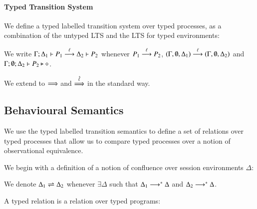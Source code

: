 \paragraph{Typed Transition System}

We define a typed labelled transition system over typed processes,
as a combination of the untyped LTS and the LTS for typed environments:

\begin{definition}\label{d:tlts}\rm
	We write
%
	$\Gamma; \Delta_1 \vdash P_1 \stackrel{\ell}{\longrightarrow} \Delta_2 \vdash P_2$
	whenever
	$P_1 \stackrel{\ell}{\longrightarrow} P_2$,
	$(\Gamma, \emptyset, \Delta_1) \stackrel{\ell}{\longrightarrow} (\Gamma, \emptyset, \Delta_2)$
	and $\Gamma; \emptyset; \Delta_2 \vdash P_2 \triangleright \diamond$.

%
\end{definition}

We extend to $\stackrel{}{\Longrightarrow}$ and $\stackrel{\hat{\ell}}{\Longrightarrow}$ in the standard way.



\subsection{Behavioural Semantics}

We use the typed labelled transition semantics to define
a set of relations over typed processes that allow us to compare
typed processes over a notion of observational equivalence.

We begin with a definition of a notion of confluence
over session environments $\Delta$:
%
\begin{definition}\rm
	We denote $\Delta_1 \rightleftharpoons \Delta_2$ whenever $\exists \Delta$ such that
	$\Delta_1 \longrightarrow^* \Delta$ and $\Delta_2 \longrightarrow^* \Delta$.
\end{definition}
%
A typed relation is a relation over typed programs:


